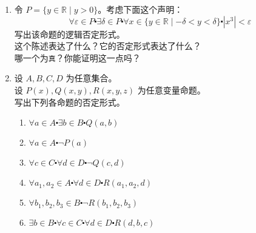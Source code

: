 \begin{enumerate}[label=(\arabic*)]
\begin{enumerate}[label=(\alph*)]
        \end{enumerate}
    \item 令 $P = \{y \in \mathbb{R} \mid y > 0\}$。考虑下面这个声明：
        \[\forall \varepsilon \in P \centerdot \exists \delta \in P \centerdot \forall x \in \{y \in \mathbb{R} \mid -\delta < y < \delta\} \centerdot |x^3| < \varepsilon\]
        写出该命题的逻辑否定形式。\\
        这个陈述表达了什么？它的否定形式表达了什么？\\
        哪一个为\verb|真|？你能证明这一点吗？
    \item 设 $A,B,C,D$ 为任意集合。\\
        设 $P(x),Q(x, y),R(x, y, z)$ 为任意变量命题。\\
        写出下列各命题的否定形式。
        \begin{enumerate}[label=(\alph*)]
            \item $\forall a \in A \centerdot \exists b \in B \centerdot Q(a, b)$
            \item $\forall a \in A \centerdot \neg P(a)$
            \item $\forall c \in C \centerdot \forall d \in D \centerdot \neg Q(c, d)$
            \item $\forall a_1, a_2 \in A \centerdot \forall d \in D \centerdot R(a_1, a_2, d)$
            \item $\forall b_1, b_2, b_3 \in B \centerdot \neg R(b_1, b_2, b_3)$
            \item $\exists b \in B \centerdot \forall c \in C \centerdot \forall d \in D \centerdot R(d, b, c)$
        \end{enumerate}
\end{enumerate}